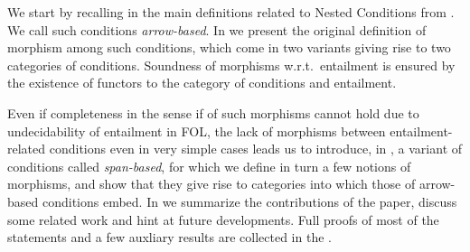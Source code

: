 We start by recalling in  the main definitions related to Nested Conditions from \cite{Rensink-FOL}. We call such conditions \emph{arrow-based}.
In  we present the original definition of morphism among such conditions, which come in two variants giving rise to two categories of conditions. Soundness of morphisms w.r.t.~entailment is ensured by the existence of functors to the category of conditions and entailment. 

Even if completeness in the sense if \cite{DBLP:conf/stoc/ChandraM77} of such morphisms cannot hold due to undecidability of entailment in FOL, the lack of morphisms between entailment-related conditions even in very simple cases leads us to introduce, in , a variant of conditions called \emph{span-based}, for which we define in turn a few notions of morphisms, and show that they give rise to categories into which those of arrow-based conditions embed.
In  we summarize the contributions of the paper, discuss some related work and hint at future developments. Full proofs of most of the statements and a few auxliary results are collected in the .


 